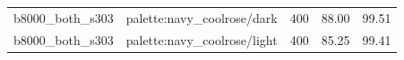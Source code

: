 \begin{longtable}{l>{\raggedright\arraybackslash}p{.42\linewidth}rrr}
b8000\_\allowbreak{}both\_\allowbreak{}s303 & %
palette:navy\_\allowbreak{}coolrose/dark & %
400 & %
88.00 & %
99.51 \\ %

b8000\_\allowbreak{}both\_\allowbreak{}s303 & %
palette:navy\_\allowbreak{}coolrose/light & %
400 & %
85.25 & %
99.41 \\ %


\end{longtable}

